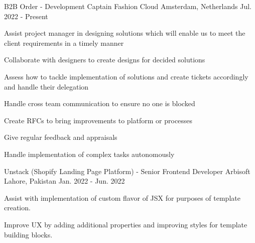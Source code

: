 

\begin{cventries}

  \cventry
    {B2B Order - Development Captain} %
    {Fashion Cloud} %
    {Amsterdam, Netherlands} %
    {Jul. 2022 - Present} %
    {
      \begin{cvitems} %
        \item {Assist project manager in designing solutions which will enable us to meet the client requirements in a timely manner}
        \item {Collaborate with designers to create designs for decided solutions}
        \item {Assess how to tackle implementation of solutions and create tickets accordingly and handle their delegation}
        \item {Handle cross team communication to ensure no one is blocked}
        \item {Create RFCs to bring improvements to platform or processes}
        \item {Give regular feedback and appraisals}
        \item {Handle implementation of complex tasks autonomously}
      \end{cvitems}
    }

  \cventry
    {Unstack (Shopify Landing Page Platform) - Senior Frontend Developer} %
    {Arbisoft} %
    {Lahore, Pakistan} %
    {Jan. 2022 - Jun. 2022} %
    {
      \begin{cvitems} %
        \item {Assist with implementation of custom flavor of JSX for purposes of template creation.}
        \item {Improve UX by adding additional properties and improving styles for template building blocks.}
      \end{cvitems}
    }
    

\end{cventries}
